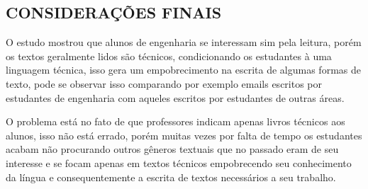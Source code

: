 \documentclass[
	article,			%
	11pt,				%
	oneside,			%
	a4paper,			%
	english,			%
	brazil,				%
	sumario=tradicional
	]{abntex2}
\begin{document}
% 

\subsection{CONSIDERAÇÕES FINAIS}
O estudo mostrou que alunos de engenharia se interessam sim pela leitura, porém os textos geralmente lidos são técnicos, condicionando os estudantes à uma linguagem técnica, isso gera um empobrecimento na escrita de algumas formas de texto, pode se observar isso comparando por exemplo emails escritos por estudantes de engenharia com aqueles escritos por estudantes de outras áreas.

O problema está no fato de que professores indicam apenas livros técnicos aos alunos, isso não está errado, porém muitas vezes por falta de tempo os estudantes acabam não procurando outros gêneros textuais que no passado eram de seu interesse e se focam apenas em textos técnicos empobrecendo seu conhecimento da língua e consequentemente a escrita de textos necessários a seu trabalho.
\postextual




%		
%		



\end{document}
